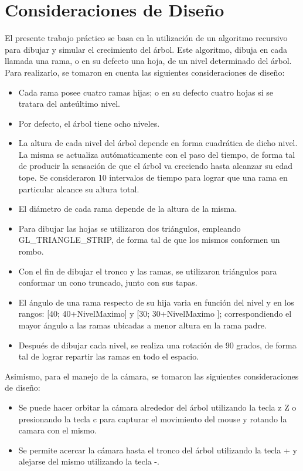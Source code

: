 \documentclass[11pt]{article}
\begin{document}
\section{Consideraciones de Dise\~no}
  El presente trabajo pr\'actico se basa en la utilizaci\'on de un algoritmo recursivo para dibujar y simular el crecimiento del \'arbol.
Este algoritmo, dibuja en cada llamada una rama, o en su defecto una hoja, de un nivel determinado del \'arbol. Para realizarlo,
se tomaron en cuenta las siguientes consideraciones de dise\~no:
\begin{itemize} 
 \item Cada rama posee cuatro ramas hijas; o en su defecto cuatro hojas si se tratara del ante\'ultimo nivel. 
 \item Por defecto, el \'arbol tiene ocho niveles.
 \item La altura de cada nivel del \'arbol depende en forma cuadr\'atica de dicho nivel. La misma se actualiza aut\'omaticamente 
con el paso del tiempo, de forma tal de producir la sensaci\'on de que el \'arbol va creciendo hasta alcanzar su edad tope. Se consideraron 10
intervalos de tiempo para lograr que una rama en particular alcance su altura total.
 \item El di\'ametro de cada rama depende de la altura de la misma.
 \item Para dibujar las hojas se utilizaron dos tri\'angulos, empleando GL\_TRIANGLE\_STRIP, de forma tal de que los mismos conformen un rombo.
 \item Con el fin de dibujar el tronco y las ramas, se utilizaron tri\'angulos para conformar un cono truncado, junto con sus tapas.
 \item El \'angulo de una rama respecto de su hija varia en funci\'on del nivel y en los rangos: [40; 40+NivelMaximo] y [30; 30+NivelMaximo ]; correspondiendo
 el mayor \'angulo a las ramas ubicadas a menor altura en la rama padre.
 \item Despu\'es de dibujar cada nivel, se realiza una rotaci\'on de 90 grados, de forma tal de lograr repartir las ramas en todo el espacio.
\end{itemize}

Asimismo, para el manejo de la c\'amara, se tomaron las siguientes consideraciones de dise\~no:
\begin{itemize} 
 \item Se puede hacer orbitar la c\'amara alrededor del \'arbol utilizando la tecla z Z o presionando la tecla c para capturar el movimiento del mouse y rotando la camara con el mismo.
\item Se permite acercar la c\'amara hasta el tronco del \'arbol utilizando la tecla + y alejarse del mismo utilizando la tecla -.
\end{itemize}
\end{document}
